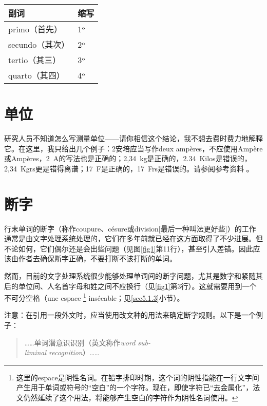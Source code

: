 \begin{center}
    \begin{tabular}{|l|l|}
        \hline
        副词 & 缩写\\
        \hline
        primo（首先） & 1$^{\rm o}$ \\
        secundo（其次） & 2$^{\rm o}$ \\
        tertio（其三） & 3$^{\rm o}$ \\
        quarto（其四） & 4$^{\rm o}$ \\
        \hline
    \end{tabular}
    
\end{center}

\section{单位}

研究人员不知道怎么写测量单位——请你相信这个结论，我不想去费时费力地解释它。在这里，我只给出几个例子：2安培应当写作deux ampères，不应使用Ampère或Ampères，2~A的写法也是正确的；2,34~kg是正确的，2.34~Kilos是错误的，2,34~Kgrs更是错得离谱；17~F是正确的，17~Frs是错误的。请参阅参考资料%
。

\section{断字}

行末单词的断字（称作coupure、césure或division[最后一种叫法更好些]）的工作通常是由文字处理系统处理的，它们在多年前就已经在这方面取得了不少进展。但不论如何，它们偶尔还是会出些问题（见图\ref{fig1}第11行），甚至引入差错。因此应该由作者去确保断字正确，不要打断不该打断的单词。

然而，目前的文字处理系统很少能够处理单词间的断字问题，尤其是数字和紧随其后的单位间、人名首字母和姓之间不应换行（见\ref{fig1}第3行）。这就需要用到一个不可分空格（une espace
    \footnote{这里的espace是阴性名词。在铅字排印时期，这个词的阴性指能在一行文字间产生用于单词或符号的“空白”的一个字符。现在，即使字符已“去金属化”，法文仍然延续了这个用法，将能够产生空白的字符作为阴性名词使用。}
insécable；见\ref{sec5.1.3}小节）。

注意：在引用一段外文时，应当使用改文种的用法来确定断字规则。以下是一个例子：

\begin{quote}
    ……单词潜意识识别（英文称作\emph{word sub-\\
    liminal recognition}）……
\end{quote}

